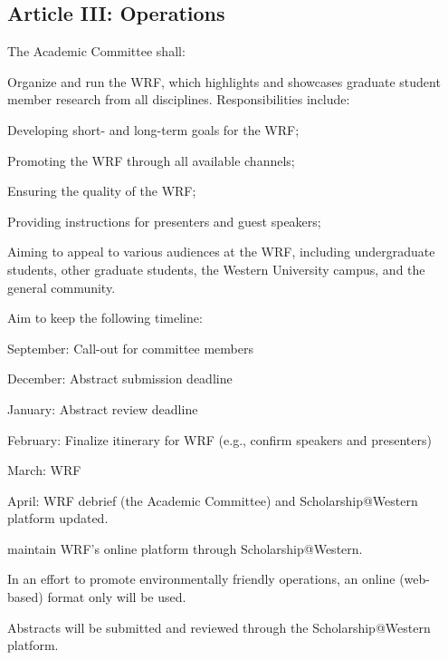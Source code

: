 \subsection{Article III: Operations}
\begin{longenum}[ label*=\thesubsection.\arabic*., align=left] 
\item The Academic Committee shall:
	\begin{longenum}[ label*=\arabic*., align=left] 
	\item Organize and run the WRF, which highlights and showcases graduate student member research from all disciplines. Responsibilities include:
		\begin{longenum}[ label*=\arabic*., align=left] 
		\item Developing short- and long-term goals for the WRF;
		\item Promoting the WRF through all available channels;
		\item Ensuring the quality of the WRF;
		\item Providing instructions for presenters and guest speakers;
		\item Aiming to appeal to various audiences at the WRF, including undergraduate students, other graduate students, the Western University campus, and the general community.
		\end{longenum}
	\item Aim to keep the following timeline:
		\begin{longenum}[ label*=\arabic*., align=left] 
		\item September: Call-out for committee members 
		\item December: Abstract submission deadline
		\item January: Abstract review deadline
		\item February: Finalize itinerary for WRF (e.g., confirm speakers and presenters)
		\item March: WRF
		\item April: WRF debrief (the Academic Committee) and Scholarship@Western platform updated.
		\end{longenum}
	\item maintain WRF’s online platform through Scholarship@Western.
		\begin{longenum}[ label*=\arabic*., align=left] 
		\item In an effort to promote environmentally friendly operations, an online (web-based) format only will be used.
		\item Abstracts will be submitted and reviewed through the Scholarship@Western platform.

\end{longenum}
\end{longenum}
\end{longenum}

